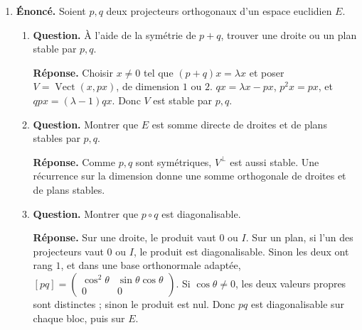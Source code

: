 \documentclass[12pt, a4paper]{article}
\begin{document}
\begin{enumerate}[label=9.\arabic*., start=94]
\begin{minipage}[t]{\linewidth}
\begin{enumerate}[\arabic*.]
  \item \textbf{Question.} Étudier la réciproque sur $\CC$.
\par\smallskip
\textbf{Réponse.} Sur $\CC$, écrire $u=S+N$ selon Dunford.
        Alors $\varphi_u=\varphi_S+\nu$, où $\nu(v)=NvN+SvN+NvS$ est nilpotente et commute avec $\varphi_S$.
        Si $\varphi_u$ est diagonalisable, $\nu=0$.

        Si $N\neq0$, choisir dans un espace propre de $S$ un vecteur $x$ tel que $y=Nx\neq0$, $Ny=0$, et $Sx=\lambda x$.
        Prendre $v(y)=x$, $v(x)=0$ (et compléter sur une base).
        Alors $\nu(v)(x)=y+\lambda x\neq0$, contradiction.
        $\therefore N=0$ et $u$ est diagonalisable.

\end{enumerate}
\end{minipage}

  \item \begin{minipage}[t]{\linewidth}\raggedright
\textbf{Énoncé.} Soient $p,q$ deux projecteurs orthogonaux d’un espace euclidien $E$.

\begin{enumerate}[\arabic*.]
        \item \textbf{Question.} À l’aide de la symétrie de $p+q$, trouver une droite ou un plan stable par $p,q$.
\par\smallskip
\textbf{Réponse.} Choisir $x\neq0$ tel que $(p+q)x=\lambda x$ et poser $V=\operatorname{Vect}(x,px)$, de dimension $1$ ou $2$.
        $q x=\lambda x-px$, $p^2x=px$, et $qpx=(\lambda-1)qx$.
        Donc $V$ est stable par $p,q$.

  \item \textbf{Question.} Montrer que $E$ est somme directe de droites et de plans stables par $p,q$.
\par\smallskip
\textbf{Réponse.} Comme $p,q$ sont symétriques, $V^\perp$ est aussi stable.
        Une récurrence sur la dimension donne une somme orthogonale de droites et de plans stables.

  \item \textbf{Question.} Montrer que $p\circ q$ est diagonalisable.
\par\smallskip
\textbf{Réponse.} Sur une droite, le produit vaut $0$ ou $I$.
        Sur un plan, si l'un des projecteurs vaut $0$ ou $I$, le produit est diagonalisable.
        Sinon les deux ont rang $1$, et dans une base orthonormale adaptée,
        $[pq]=\begin{pmatrix}\cos^2\theta&\sin\theta\cos\theta\\0&0\end{pmatrix}$.
        Si $\cos\theta\neq0$, les deux valeurs propres sont distinctes ; sinon le produit est nul.
        Donc $pq$ est diagonalisable sur chaque bloc, puis sur $E$.


\end{enumerate}
\end{minipage}
\end{enumerate}
\end{document}
